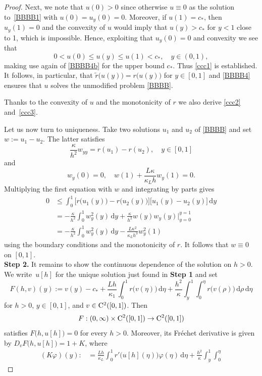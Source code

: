 \documentclass[reqno,11pt]{amsart}
\numberwithin{equation}{section}
\newcommand{\rd}{\mathrm{d}}
\begin{document}
\begin{proof}
Next,  we note that $u(0)>0$ since otherwise $u\equiv 0$ as the
solution to~\eqref{BBBB1} with $u(0)=u_y(0)=0$. Moreover, if
$u(1)=c_*$, then $u_y(1)=0$ and the convexity of $u$ would imply that
$u(y)>c_*$ for $y<1$ close to 1, which is impossible. Hence,
exploiting that $u_y(0)=0$ and convexity we see that
$$
0< u(0)\le u(y)\le u(1)< c_*,\quad y\in (0,1),
$$
making use again of \eqref{BBBB4b} for the upper bound $c_*$. Thus
\eqref{ccc1} is established. It follows, in particular, that $\tilde r
\bigl( u(y)\bigr) =r \bigl( u(y)\bigr)$ for $y\in [0,1]$ and
\eqref{BBBB4} ensures that $u$ solves the unmodified problem
\eqref{BBBB}.

Thanks to the convexity of $u$ and the monotonicity of $r$ we also
derive \eqref{ccc2} and~\eqref{ccc3}.
 
Let us now turn to uniqueness. Take two solutions $u_1$ and $u_2$ of
\eqref{BBBB} and set $w:=u_1-u_2$. The latter satisfies
$$
\frac{\kappa}{h^2} w_{yy}= r(u_1)-r(u_2), \quad y\in [0,1]
$$
and
$$
w_y(0)=0,\quad w(1)+\frac{L\kappa}{\kappa_Lh}w_y(1)=0. 
$$
Multiplying the first equation with $w$ and integrating by parts
gives
\begin{align*}
0&\le\int_0^1\Big[r\bigl(u_1(y)\bigr)-r\bigl(u_2(y)\bigr)\Big]\Big[u_1(y)-u_2(y)\Big]\,\rd y\\
&=-\frac{\kappa}{h^2} \int_0^1 w_y^2(y)\,\rd y+ \frac{\kappa}{h^2} w(y)w_y(y)\Big\vert_{y=0}^{y=1}\\
&= -\frac{\kappa}{h^2} \int_0^1 w_y^2(y)\,\rd y -  \frac{L\kappa^2}{\kappa_L h^3} w_y^2(1)
\end{align*}
using the boundary conditions and the monotonicity of $r$. It follows
that $w\equiv 0$ on $[0,1]$.\\[.1cm]
{\bf Step 2.} It remains to show the continuous dependence of the
solution on $h>0$. We write~$u[h]$ for the unique solution just found
in {\bf Step 1} and set
\begin{equation*}
F(h,v)(y):=v(y)-c_*+\frac{Lh}{\kappa_1}\int_0^1r\bigl(v(\eta)\bigr)\,\rd \eta
+\frac{h^2}{\kappa} \int_y^1 \int _0^\eta r\bigl(v(\rho)\bigr)\,\rd
\rho\, \rd\eta
\end{equation*}
for $h>0$, $y\in [0,1]$, and $v\in {\rm C}^2([0,1])$. Then
$$
F:(0,\infty)\times {\rm C}^2([0,1])\rightarrow
{\rm C}^2([0,1])
$$ 
satisfies $F\bigl(h,u[h]\bigr)=0$ for every
$h>0$. Moreover, its Fr\'echet derivative is given by $D_v
F\bigl(h,u[h]\bigr)=1+K$, where
\begin{align*}
(K\varphi) (y):&=\frac{Lh}{\kappa_L}\int_0^1 r'\bigl( u[h](\eta)
\bigr)\varphi(\eta)\,\rd \eta+\frac{h^2}{\kappa} \int_y^1 \int_0^\eta

\end{align*}
\end{proof}
\end{document}
